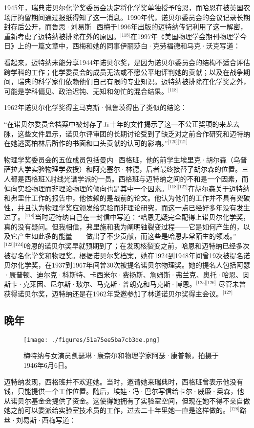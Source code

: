 1945年，瑞典诺贝尔化学奖委员会决定将化学奖单独授予哈恩，而哈恩在被英国农场厅拘留期间通过报纸得知了这一消息。1990年代，诺贝尔委员会的会议记录长期封存后公开，而鲁思·刘易斯·西梅于1996年出版的迈特纳传记利用了这一解密，重新考虑了迈特纳被排除在外的原因。\(^\text{[118]}\)在1997年《美国物理学会期刊物理学今日》上的一篇文章中，西梅和她的同事伊丽莎白·克劳福德和马克·沃克写道：

看起来，迈特纳未能分享1944年诺贝尔奖，是因为诺贝尔委员会的结构不适合评估跨学科的工作；化学委员会的成员无法或不愿公平地评判她的贡献；以及在战争期间，瑞典的科学家们依赖他们自己有限的专业知识。迈特纳被排除在化学奖之外，可能是学科偏见、政治迟钝、无知和匆忙的混合结果。\(^\text{[118]}\)

1962年诺贝尔化学奖得主马克斯·佩鲁茨得出了类似的结论：

“在诺贝尔委员会档案中被封存了五十年的文件揭示了这一不公正奖项的来龙去脉，这些文件显示，诺贝尔评审团的长期讨论受到了缺乏对之前合作研究和迈特纳在她逃离柏林后所作的书面和口头贡献的认可的影响。”\(^\text{[120][121]}\)

物理学奖委员会的五位成员包括曼内·西格班，他的前学生埃里克·胡尔森（乌普萨拉大学实验物理学教授）和阿克塞尔·林德，后者最终接替了胡尔森的位置。三人都是西格班X射线光谱学派的一员。西格班与迈特纳之间的不和是一个因素，而偏向实验物理而非理论物理的倾向也是其中一个因素。\(^\text{[118][122]}\)在胡尔森关于迈特纳和弗里什工作的报告中，他依赖的是战前的论文。他认为他们的工作并不具有突破性，并且认为物理学奖应颁发给实验而非理论研究，而这一点已经好多年没有发生过了。\(^\text{[118]}\)当时迈特纳自己在一封信中写道：“哈恩无疑完全配得上诺贝尔化学奖，真的没有疑问。但我相信，弗里施和我为阐明铀裂变过程——它是如何产生的，以及它产生如此多的能量——做出了不少贡献，而这些是哈恩非常陌生的领域。”\(^\text{[123][124]}\)哈恩的诺贝尔奖早就预期到了；在发现核裂变之前，哈恩和迈特纳已经多次被提名化学奖和物理奖。根据诺贝尔奖档案，她在1924到1948年间曾19次被提名诺贝尔化学奖，在1937到1967年间曾30次被提名诺贝尔物理奖。她的提名人包括阿瑟·康普顿、迪尔克·科斯特、卡西米尔·费扬斯、詹姆斯·弗兰克、奥托·哈恩、奥斯卡·克莱因、尼尔斯·玻尔、马克斯·普朗克和马克斯·博恩。\(^\text{[125][126]}\) 尽管未曾获得诺贝尔奖，迈特纳还是在1962年受邀参加了林道诺贝尔奖得主会议。\(^\text{[127]}\)
\subsection{晚年}
\begin{figure}[ht]
\centering
\texttt{[image: ./figures/51a75ee5ba7cb3de.png]}
\caption{梅特纳与女演员凯瑟琳·康奈尔和物理学家阿瑟·康普顿，拍摄于1946年6月6日。} \label{fig_LZm_13}
\end{figure}
迈特纳发现，西格班并不欢迎她。当时，邀请她来瑞典时，西格班曾表示他没有钱，只能提供一个工作位置。随后，埃娃·冯·巴尔写信给卡尔·威廉·奥森，他从诺贝尔基金会提供了资金。这使得她拥有了实验室空间，但现在她不得不亲自做她之前可以委派给实验室技术员的工作，过去二十年里她一直是这样做的。\(^\text{[128]}\)路丝·刘易斯·西梅写道：

